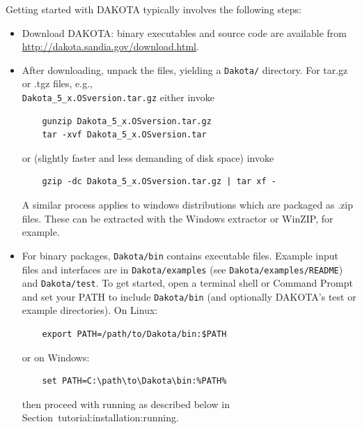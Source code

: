 Getting started with DAKOTA typically involves the following steps:
\begin{itemize}
  \item Download DAKOTA: binary executables and source code are
    available from\\
    \url{http://dakota.sandia.gov/download.html}.

  \item After downloading, unpack the files, yielding a {\tt Dakota/}
    directory.  For tar.gz or .tgz files, e.g.,\\
    \texttt{Dakota\_5\_x.OSversion.tar.gz} either invoke
    \begin{small}
\begin{verbatim}
    gunzip Dakota_5_x.OSversion.tar.gz
    tar -xvf Dakota_5_x.OSversion.tar
\end{verbatim}
    \end{small}
    or (slightly faster and less demanding of disk space) invoke
    \begin{small}
\begin{verbatim}
    gzip -dc Dakota_5_x.OSversion.tar.gz | tar xf -
\end{verbatim}
    \end{small}
    A similar process applies to windows distributions which are
    packaged as .zip files.  These can be extracted with the Windows
    extractor or WinZIP, for example.

  \item For binary packages, {\tt Dakota/bin} contains executable
    files. Example input files and interfaces are in
    \texttt{Dakota/examples} (see \texttt{Dakota/examples/README}) and
    \texttt{Dakota/test}.  To get started, open a terminal shell or
    Command Prompt and set your PATH to include {\tt Dakota/bin} (and
    optionally DAKOTA's test or example directories).  On Linux:
    \begin{small}
\begin{verbatim}
    export PATH=/path/to/Dakota/bin:$PATH
\end{verbatim}
    \end{small}
    or on Windows:
    \begin{small}
\begin{verbatim}
    set PATH=C:\path\to\Dakota\bin:%PATH%
\end{verbatim}
    \end{small}
    then proceed with running as described below in 
    Section~{tutorial:installation:running}.


\end{itemize}
